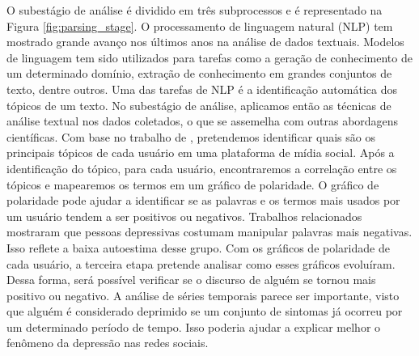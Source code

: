 \documentclass[11pt, notitlepage]{article} %
\begin{document}
O subestágio de análise é dividido em três subprocessos e é representado na Figura \ref{fig:parsing_stage}. O processamento de linguagem natural (NLP) tem mostrado grande avanço nos últimos anos na análise de dados textuais. Modelos de linguagem tem sido utilizados para tarefas como a geração de conhecimento de um determinado domínio, extração de conhecimento em grandes conjuntos de texto, dentre outros. Uma das tarefas de NLP 
é a identificação automática dos tópicos de um texto. 
No subestágio de análise, aplicamos então as técnicas de análise textual nos dados coletados, o que se assemelha com outras abordagens científicas. Com base no trabalho de \cite{Nolasco2016}, pretendemos identificar quais são os principais tópicos de cada usuário em uma plataforma de mídia social. 
Após a identificação do tópico, para cada usuário, encontraremos a correlação entre os tópicos e mapearemos os termos em um gráfico de polaridade. 
O gráfico de polaridade pode ajudar a identificar se as palavras e os termos mais usados por um usuário tendem a ser positivos ou negativos.
Trabalhos relacionados mostraram que pessoas depressivas costumam manipular palavras mais negativas. Isso reflete a baixa autoestima desse grupo. Com os gráficos de polaridade de cada usuário, a terceira etapa pretende analisar como esses gráficos evoluíram. Dessa forma, será possível verificar se o discurso de alguém se tornou mais positivo ou negativo. A análise de séries temporais parece ser importante, visto que alguém é considerado deprimido se um conjunto de sintomas já ocorreu por um determinado período de tempo. Isso poderia ajudar a explicar melhor o fenômeno da depressão nas redes sociais.
\end{document}
